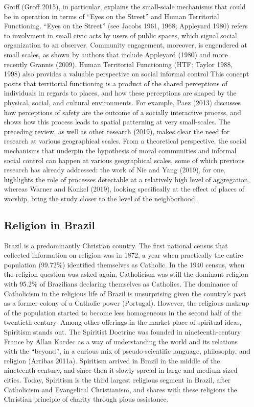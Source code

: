 \documentclass[smallextended]{svjour3}       %
\begin{document}
Groff (Groff 2015), in particular, explains the small-scale mechanisms
that could be in operation in terms of ``Eyes on the Street'' and Human
Territorial Functioning. ``Eyes on the Street'' (see Jacobs 1961, 1968;
Appleyard 1980) refers to involvment in small civic acts by users of
public spaces, which signal social organization to an observer.
Community engagement, moreover, is engendered at small scales, as shown
by authors that include Appleyard (1980) and more recently Grannis
(2009). Human Territorial Functioning (HTF; Taylor 1988, 1998) also
provides a valuable perspective on social informal control This concept
posits that territorial functioning is a product of the shared
perceptions of individuals in regards to places, and how these
perceptions are shaped by the physical, social, and cultural
environments. For example, Paez (2013) discusses how perceptions of
safety are the outcome of a socially interactive process, and shows how
this process leads to spatial patterning at very small-scales. The
preceding review, as well as other research (2019), makes clear the need
for research at various geographical scales. From a theoretical
perspective, the social mechanisms that underpin the hypothesis of moral
communities and informal social control can happen at various
geographical scales, some of which previous research has already
addressed: the work of Nie and Yang (2019), for one, highlights the role
of processes detectable at a relatively high level of aggregation,
whereas Warner and Konkel (2019), looking specifically at the effect of
places of worship, bring the study closer to the level of the
neighborhood.

\hypertarget{religion-in-brazil}{%
\subsection{Religion in Brazil}\label{religion-in-brazil}}

Brazil is a predominantly Christian country. The first national census
that collected information on religion was in 1872, a year when
practically the entire population (99.72\%) identified themselves as
Catholic. In the 1940 census, when the religion question was asked
again, Catholicism was still the dominant religion with 95.2\% of
Brazilians declaring themselves as Catholics. The dominance of
Catholicism in the religious life of Brazil is unsurprising given the
country's past as a former colony of a Catholic power (Portugal).
However, the religious makeup of the population started to become less
homogeneous in the second half of the twentieth century. Among other
offerings in the market place of spiritual ideas, Spiritism stands out.
The Spiritist Doctrine was founded in nineteenth-century France by Allan
Kardec as a way of understanding the world and its relations with the
``beyond'', in a curious mix of pseudo-scientific language, philosophy,
and religion (Arribas 2011a). Spiritism arrived in Brazil in the middle
of the nineteenth century, and since then it slowly spread in large and
medium-sized cities. Today, Spiritism is the third largest religious
segment in Brazil, after Catholicism and Evangelical Christianism, and
shares with these religions the Christian principle of charity through
pious assistance.
\end{document}
